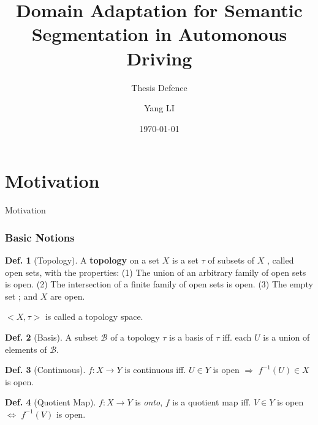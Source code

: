 \documentclass[aspectratio=169,t,xcolor=table,bottom=5cm]{beamer}
\theoremstyle{definition}
\newtheorem*{defi}{Def.}
\begin{document}
\title[Pre]{Domain Adaptation for Semantic Segmentation in Automonous Driving}
\subtitle{Thesis Defence}

\author{Yang LI}

\date{\today}
\frame[noframenumbering]{\titlepage}





\section{Motivation}
\begin{frame}{Motivation}
\end{frame}

\begin{frame}[allowframebreaks]
	\frametitle{Basic Notions}
	\vspace{-2cm}
	\begin{defi}[Topology] 
		A \textbf{topology} on a set $X$ is a set $\tau$ of subsets of $X$ , called open sets, with the properties: (1) The union of an arbitrary family of open sets is open. (2) The intersection of a finite family of open sets is open. (3) The empty set ; and $X$ are open.
	\end{defi}
	$<X,\tau>$ is called a topology space.
	
	\framebreak
	
	\begin{defi}[Basis]
		A subset $\mathscr{B}$ of a topology $\tau$ is a basis of $\tau$ iff. each $U$ is a union of elements of $\mathscr{B}$.
	\end{defi}
	\vspace{-2em}
	\begin{defi}[Continuous]
		$f: X \to Y$ is continuous iff. $U \in Y$ is open $\Longrightarrow$ $f^{-1}(U) \in X$ is open. 
	\end{defi}
	\framebreak
	
	\begin{defi}[Quotient Map]
		$f: X \to Y$ is \textit{onto}, $f$ is a quotient map iff. $V \in Y$ is open $\iff$ $f^{-1}(V)$ is open. 
	\end{defi}
	
	
	
\end{frame}
\end{document}
